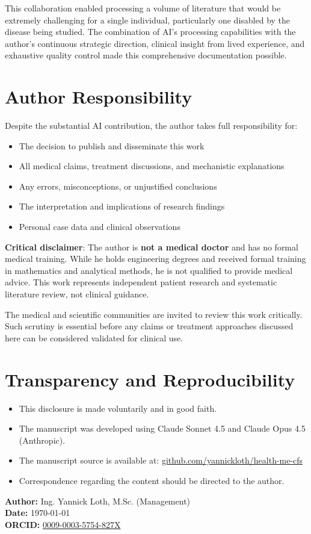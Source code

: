 This collaboration enabled processing a volume of literature that would be extremely challenging for a single individual, particularly one disabled by the disease being studied. The combination of AI's processing capabilities with the author's continuous strategic direction, clinical insight from lived experience, and exhaustive quality control made this comprehensive documentation possible.

\section*{Author Responsibility}

Despite the substantial AI contribution, the author takes full responsibility for:

\begin{itemize}
    \item The decision to publish and disseminate this work
    \item All medical claims, treatment discussions, and mechanistic explanations
    \item Any errors, misconceptions, or unjustified conclusions
    \item The interpretation and implications of research findings
    \item Personal case data and clinical observations
\end{itemize}

\textbf{Critical disclaimer}: The author is \textbf{not a medical doctor} and has no formal medical training. While he holds engineering degrees and received formal training in mathematics and analytical methods, he is not qualified to provide medical advice. This work represents independent patient research and systematic literature review, not clinical guidance.

The medical and scientific communities are invited to review this work critically. Such scrutiny is essential before any claims or treatment approaches discussed here can be considered validated for clinical use.

\section*{Transparency and Reproducibility}

\begin{itemize}
    \item This disclosure is made voluntarily and in good faith.
    \item The manuscript was developed using Claude Sonnet 4.5 and Claude Opus 4.5 (Anthropic).
    \item The manuscript source is available at: \href{https://github.com/yannickloth/health-me-cfs}{github.com/yannickloth/health-me-cfs}
    \item Correspondence regarding the content should be directed to the author.
\end{itemize}

\vspace{1em}
\noindent\textbf{Author:} Ing. Yannick Loth, M.Sc. (Management)\\
\textbf{Date:} \today\\
\textbf{ORCID:} \href{https://orcid.org/0009-0003-5754-827X}{0009-0003-5754-827X}

